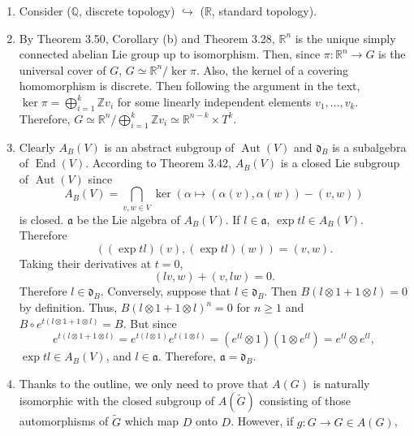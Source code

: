 \begin{enumerate}
Also, for $\eta\colon G \times G \rightarrow G, (\sigma, \tau) \rightarrow \sigma \tau$, 
$\eta(\operatorname{id}_{G}, \varphi)$ is a constant function to $e$. 
Thus $0=d \eta(d\operatorname{id}_{G}, d\varphi)=d\operatorname{id}_{G}+d\varphi$ and $d\varphi(X)(e)=-X(e)$. 
Also, by the same argument, $d\varphi(\mathfrak{h}) \subset \mathfrak{g}$. 
Then, since $\varphi$ is an involution, $d\varphi d\varphi=\operatorname{id}$, 
so $\mathfrak{g}$ and $\mathfrak{h}$ are isomorphic via $d \varphi$.
\item Consider ($\mathbb{Q}$, discrete topology) $\hookrightarrow$ ($\mathbb{R}$, standard topology).
\item By Theorem 3.50, Corollary (b) and Theorem 3.28, $\mathbb{R}^{n}$ is the unique simply connected abelian Lie group up to isomorphism. 
Then, since $\pi\colon \mathbb{R}^{n} \rightarrow G$ is the universal cover of $G$, $G \simeq \mathbb{R}^{n} / \ker \pi$. 
Also, the kernel of a covering homomorphism is discrete. 
Then following the argument in the text, $\ker \pi=\bigoplus_{i=1}^{k} \mathbb{Z} v_{i}$ for some linearly independent elements $v_{1}, \ldots, v_{k}$. 
Therefore, $G \simeq \mathbb{R}^{n} / \bigoplus_{i=1}^{k} \mathbb{Z} v_{i} \simeq \mathbb{R}^{n-k} \times T^{k}$.
\item Clearly $A_{B}(V)$ is an abstract subgroup of $\operatorname{Aut}(V)$ 
and $\mathfrak{d}_{B}$ is a subalgebra of $\operatorname{End}(V)$. 
According to Theorem 3.42, $A_{B}(V)$ is a closed Lie subgroup of $\operatorname{Aut}(V)$ since
\[A_{B}(V)=\bigcap_{v, w \in V} \ker(\alpha \mapsto(\alpha(v), \alpha(w))-(v, w))\]
is closed. $\mathfrak{a}$ be the Lie algebra of $A_{B}(V)$. 
If $l \in \mathfrak{a}$, $\exp tl \in A_{B}(V)$. Therefore
\[((\exp tl)(v),(\exp tl)(w))=(v, w).\]
Taking their derivatives at $t=0$,
\[(lv, w)+(v, lw)=0.\]
Therefore $l \in \mathfrak{d}_{B}$. Conversely, suppose that $l \in \mathfrak{d}_{B}$. 
Then $B(l \otimes 1+1 \otimes l)=0$ by definition. 
Thus, $B(l \otimes 1+1 \otimes l)^{n}=0$ for $n \geq 1$ and $B \circ e^{t(l \otimes 1+1 \otimes l)}=B$. 
But since \[e^{t(l \otimes 1+1 \otimes l)}=e^{t(l \otimes 1)} e^{t(1 \otimes l)}
=(e^{tl} \otimes 1)(1 \otimes e^{t l})=e^{tl} \otimes e^{tl},\]
$\exp tl \in A_{B}(V)$, and $l \in \mathfrak{a}$. 
Therefore, $\mathfrak{a}=\mathfrak{d}_{B}$.
\item Thanks to the outline, we only need to prove that $A(G)$ is naturally isomorphic with the closed subgroup of $A(\tilde{G})$ consisting of those automorphisms of $\tilde{G}$ which map $D$ onto $D$. 
However, if $g\colon G \rightarrow G \in A(G)$, 

\end{enumerate}
